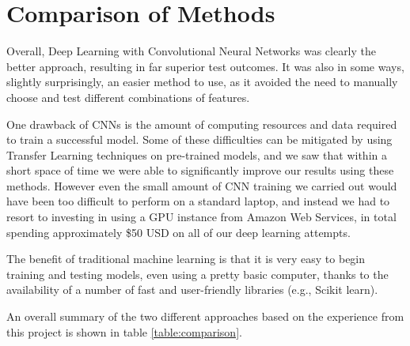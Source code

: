 \documentclass[10pt,a4paper]{article}
\begin{document}
\section{Comparison of Methods}

Overall, Deep Learning with Convolutional Neural Networks was clearly the better approach, resulting in far superior test outcomes. It was also in some ways, slightly surprisingly, an easier method to use, as it avoided the need to manually choose and test different combinations of features.

One drawback of CNNs is the amount of computing resources and data required to train a successful model. Some of these difficulties can be mitigated by using Transfer Learning techniques on pre-trained models, and we saw that within a short space of time we were able to significantly improve our results using these methods. However even the small amount of CNN training we carried out would have been too difficult to perform on a standard laptop, and instead we had to resort to investing in using a GPU instance from Amazon Web Services, in total spending approximately \$50 USD on all of our deep learning attempts.

The benefit of traditional machine learning is that it is very easy to begin training and testing models, even using a pretty basic computer, thanks to the availability of a number of fast and user-friendly libraries (e.g., Scikit learn).

An overall summary of the two different approaches based on the experience from this project is shown in table \ref{table:comparison}.
\end{document}
